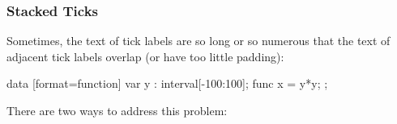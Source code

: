 \subsubsection{Stacked Ticks}
\label{section-dv-stacking}

Sometimes, the text of tick labels are so long or so numerous that the text of
adjacent tick labels overlap (or have too little padding):
%
\begin{codeexample}[preamble={\usetikzlibrary{datavisualization.formats.functions}}]
\tikz \datavisualization [scientific axes,
                          all axes={length=2.5cm},
                          visualize as smooth line]
  data [format=function] {
    var y : interval[-100:100];
    func x = \value y*\value y;
  };
\end{codeexample}
%
There are two ways to address this problem:
%
